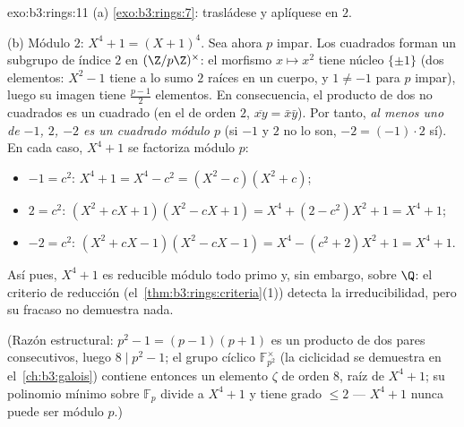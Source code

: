 \begin{solution}{exo:b3:rings:11}
(a) \cref{exo:b3:rings:7}: trasládese y aplíquese
 en $2$.

(b) Módulo $2$: $X^4 + 1 = (X + 1)^4$. Sea ahora $p$ impar. Los
cuadrados forman un subgrupo de índice $2$ en $(\Z/p\Z)^\times$: el
morfismo $x \mapsto x^2$ tiene núcleo $\{\pm 1\}$ (dos elementos: $X^2
- 1$ tiene a lo sumo $2$ raíces en un cuerpo, y $1 \neq -1$ para $p$
impar), luego su imagen tiene $\frac{p-1}2$ elementos. En consecuencia,
el producto de dos no cuadrados es un cuadrado (en el
 de orden $2$,
$\overline{xy} = \bar x\bar y$). Por tanto, \emph{al menos uno de $-1$,
$2$, $-2$ es un cuadrado módulo $p$} (si $-1$ y $2$ no lo son,
$-2 = (-1)\cdot 2$ sí). En cada caso, $X^4 + 1$ se factoriza módulo $p$:
\begin{itemize}
  \item $-1 = c^2$: \quad $X^4 + 1 = X^4 - c^2 = (X^2 - c)(X^2 +
        c)$;
  \item $2 = c^2$: \quad $(X^2 + cX + 1)(X^2 - cX + 1) = X^4 + (2
        - c^2)X^2 + 1 = X^4 + 1$;
  \item $-2 = c^2$: \quad $(X^2 + cX - 1)(X^2 - cX - 1) = X^4 -
        (c^2 + 2)X^2 + 1 = X^4 + 1$.
\end{itemize}
Así pues, $X^4+1$ es reducible módulo todo primo y, sin embargo,
 sobre $\Q$: el criterio
de reducción (el~\cref{thm:b3:rings:criteria}(1)) detecta la
irreducibilidad, pero su fracaso no demuestra nada.

(Razón estructural: $p^2 - 1 = (p-1)(p+1)$ es un producto de dos pares
consecutivos, luego $8 \mid p^2 - 1$; el grupo cíclico
$\mathbb F_{p^2}^\times$ (la ciclicidad se demuestra en
el~\cref{ch:b3:galois}) contiene entonces un elemento $\zeta$ de orden
$8$, raíz de $X^4 + 1$; su polinomio mínimo sobre $\mathbb
F_p$ divide a $X^4+1$ y tiene grado $\leq 2$ --- $X^4+1$ nunca puede ser
 módulo $p$.)
\end{solution}

